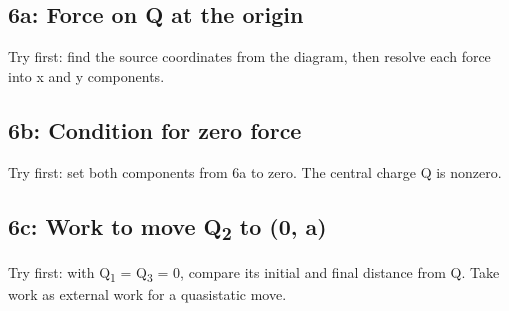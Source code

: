 \documentclass[11pt]{article}
\begin{document}
\begin{keepsection}
\begin{keepsection}
\subsection{6a: Force on Q at the origin}

Try first: find the source coordinates from the diagram, then resolve each force into x and y components.

\end{keepsection}

\begin{keepsection}
\subsection{6b: Condition for zero force}

Try first: set both components from 6a to zero. The central charge Q is nonzero.

\end{keepsection}

\begin{keepsection}
\subsection{6c: Work to move Q\textsubscript{2} to (0, a)}

Try first: with Q\textsubscript{1} = Q\textsubscript{3} = 0, compare its initial and final distance from Q. Take work as external work for a quasistatic move.

\end{keepsection}
\end{keepsection}


\clearpage
\end{document}
